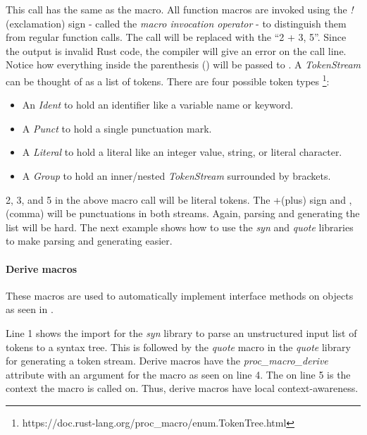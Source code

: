 This call has the same  as the macro.
All function macros are invoked using the \textit{!} (exclamation) sign - called the \textit{macro invocation operator} - to distinguish them from regular function calls.
The call will be replaced with the  ``2 + 3, 5''.
Since the output is invalid Rust code, the compiler will give an error on the call line.
Notice how everything inside the parenthesis () will be passed to .
A \textit{TokenStream} can be thought of as a list of tokens.
There are four possible token types \footnote{https://doc.rust-lang.org/proc\_macro/enum.TokenTree.html}:

\begin{itemize}
	\item An \textit{Ident} to hold an identifier like a variable name or keyword.
	\item A \textit{Punct} to hold a single punctuation mark.
	\item A \textit{Literal} to hold a literal like an integer value, string, or literal character.
	\item A \textit{Group} to hold an inner/nested \textit{TokenStream} surrounded by brackets.
\end{itemize}

2, 3, and 5 in the above macro call will be literal tokens.
The +(plus) sign and ,(comma) will be punctuations in both streams.
Again, parsing and generating the list will be hard.
The next example shows how to use the \textit{syn} and \textit{quote} libraries to make parsing and generating easier.

\paragraph{Derive macros}
These macros are used to automatically implement interface methods on objects as seen in .


Line 1 shows the import for the \textit{syn} library to parse an unstructured input list of tokens to a syntax tree.
This is followed by the \textit{quote} macro in the \textit{quote} library for generating a token stream.
Derive macros have the \textit{proc\_macro\_derive} attribute with an argument for the macro  as seen on line 4.
The  on line 5 is the context the macro is called on.
Thus, derive macros have local context-awareness.

